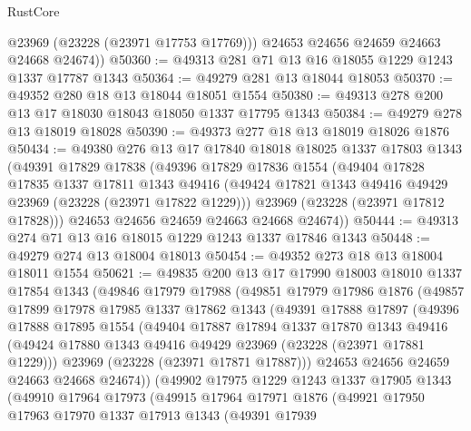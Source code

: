 \begin{lexlean}{RustCore}
\begin{coremodule}
          @23969
          (@23228 (@23971 @17753 @17769)))
        @24653
        @24656
        @24659
        @24663
        @24668
        @24674))
@50360 := @49313 @281 @71 @13 @16 @18055 @1229 @1243 @1337 @17787 @1343
@50364 := @49279 @281 @13 @18044 @18053
@50370 := @49352 @280 @18 @13 @18044 @18051 @1554
@50380 := @49313 @278 @200 @13 @17 @18030 @18043 @18050 @1337 @17795 @1343
@50384 := @49279 @278 @13 @18019 @18028
@50390 := @49373 @277 @18 @13 @18019 @18026 @1876
@50434 := @49380
    @276
    @13
    @17
    @17840
    @18018
    @18025
    @1337
    @17803
    @1343
    (@49391
      @17829
      @17838
      (@49396
        @17829
        @17836
        @1554
        (@49404
          @17828
          @17835
          @1337
          @17811
          @1343
          @49416
          (@49424 @17821 @1343 @49416 @49429 @23969 (@23228 (@23971 @17822 @1229)))
          @23969
          (@23228 (@23971 @17812 @17828)))
        @24653
        @24656
        @24659
        @24663
        @24668
        @24674))
@50444 := @49313 @274 @71 @13 @16 @18015 @1229 @1243 @1337 @17846 @1343
@50448 := @49279 @274 @13 @18004 @18013
@50454 := @49352 @273 @18 @13 @18004 @18011 @1554
@50621 := @49835
    @200
    @13
    @17
    @17990
    @18003
    @18010
    @1337
    @17854
    @1343
    (@49846
      @17979
      @17988
      (@49851
        @17979
        @17986
        @1876
        (@49857
          @17899
          @17978
          @17985
          @1337
          @17862
          @1343
          (@49391
            @17888
            @17897
            (@49396
              @17888
              @17895
              @1554
              (@49404
                @17887
                @17894
                @1337
                @17870
                @1343
                @49416
                (@49424 @17880 @1343 @49416 @49429 @23969 (@23228 (@23971 @17881 @1229)))
                @23969
                (@23228 (@23971 @17871 @17887)))
              @24653
              @24656
              @24659
              @24663
              @24668
              @24674))
          (@49902
            @17975
            @1229
            @1243
            @1337
            @17905
            @1343
            (@49910
              @17964
              @17973
              (@49915
                @17964
                @17971
                @1876
                (@49921
                  @17950
                  @17963
                  @17970
                  @1337
                  @17913
                  @1343
                  (@49391
                    @17939

\end{coremodule}
\end{lexlean}
